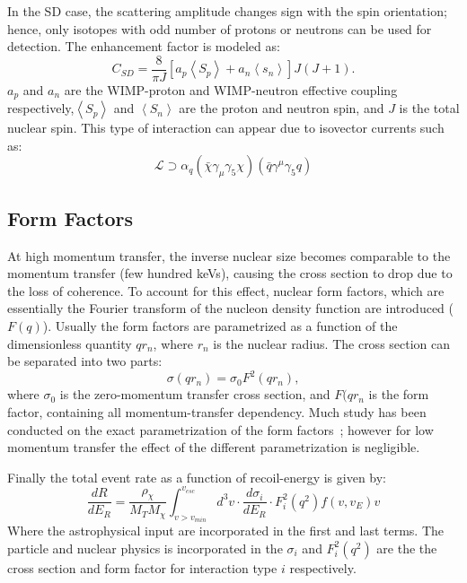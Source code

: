 In the SD case, the scattering amplitude changes sign with the spin orientation; hence, only isotopes with odd number of protons  or neutrons can be used for detection. The enhancement factor is modeled as:
\begin{equation}
C_{SD} = \frac{8}{\pi J}[a_p\left<S_p\right> + a_n\left<s_n\right>]J(J+1).
\end{equation}  
$a_p$ and $a_n$ are the WIMP-proton and WIMP-neutron effective coupling respectively,$\left<S_p\right>$ and  $\left<S_n\right>$ are the proton and neutron spin, and $J$ is the total nuclear spin. This type of interaction can appear due to isovector currents such as:
\begin{equation}
\mathcal{L} \supset \alpha_q(\bar{\chi}\gamma_\mu\gamma_5\chi)(\bar{q}\gamma^\mu\gamma_5q)
\end{equation}
\subsection{Form Factors}

At high momentum transfer, the inverse nuclear size becomes comparable to the momentum transfer (few hundred keVs), causing the cross section to drop due to the loss of coherence. To account for this effect, nuclear form factors, which are essentially the Fourier transform of the nucleon density function are introduced ($F(q)$). Usually the form factors are parametrized as a function of  the dimensionless quantity $qr_n$, where $r_n$ is the nuclear radius. The cross section can be separated into two parts:
\begin{equation}
\sigma(qr_n) = \sigma_0F^2(qr_n),
\end{equation}
where $\sigma_0$ is the zero-momentum transfer cross section, and $F(qr_n$ is the form factor, containing all momentum-transfer dependency. Much study has been conducted on the exact parametrization of the form factors~\cite{Feldstein:2009tr}; however for low momentum transfer the effect of the different parametrization is negligible. 

Finally the total event rate as a function of recoil-energy is given by:
\begin{equation}
\frac{dR}{dE_R} = \frac{\rho_\chi}{M_TM_\chi}\int_{v>v_{min}}^{v_{esc}}d^3v\cdot \frac{d\sigma_i}{dE_R}\cdot F_i^2(q^2)f(v,v_E)v
\end{equation} 
Where the astrophysical input are incorporated in the first and last terms. The particle and nuclear physics is incorporated in the $\sigma_i$ and $F^2_i(q^2)$ are the the cross section and form factor for interaction type $i$ respectively.

